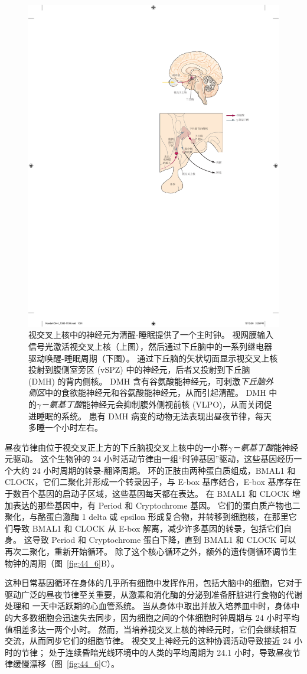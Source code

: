 \begin{figure}[htbp]
	\centering
	\includegraphics[width=0.5\linewidth]{chap44/fig_44_7}
	\caption{视交叉上核中的神经元为清醒-睡眠提供了一个主时钟。
		视网膜输入信号光激活视交叉上核（上图），然后通过下丘脑中的一系列继电器驱动唤醒-睡眠周期（下图）。
		通过下丘脑的矢状切面显示视交叉上核投射到腹侧室旁区 (vSPZ) 中的神经元，后者又投射到下丘脑 (DMH) 的背内侧核。
		DMH 含有谷氨酸能神经元，可刺激\textit{下丘脑外侧区}中的食欲能神经元和谷氨酸能神经元，从而引起清醒。
		DMH 中的\textit{$\gamma$－氨基丁酸}能神经元会抑制腹外侧视前核 (VLPO)，从而关闭促进睡眠的系统。
		患有 DMH 病变的动物无法表现出昼夜节律，每天多睡一个小时左右。}
	\label{fig:44_7}
\end{figure}


昼夜节律由位于视交叉正上方的下丘脑视交叉上核中的一小群\textit{$\gamma$－氨基丁酸}能神经元驱动。
这个生物钟的 24 小时活动节律由一组“时钟基因”驱动，这些基因经历一个大约 24 小时周期的转录-翻译周期。
环的正肢由两种蛋白质组成，BMAL1 和 CLOCK，它们二聚化并形成一个转录因子，与 E-box 基序结合，E-box 基序存在于数百个基因的启动子区域，这些基因每天都在表达。
在 BMAL1 和 CLOCK 增加表达的那些基因中，有 Period 和 Cryptochrome 基因。
它们的蛋白质产物也二聚化，与酪蛋白激酶 1 delta 或 epsilon 形成复合物，并转移到细胞核，在那里它们导致 BMAL1 和 CLOCK 从 E-box 解离，减少许多基因的转录，包括它们自身。
这导致 Period 和 Cryptochrome 蛋白下降，直到 BMAL1 和 CLOCK 可以再次二聚化，重新开始循环。
除了这个核心循环之外，额外的遗传侧循环调节生物钟的周期（图~\ref{fig:44_6}B）。


这种日常基因循环在身体的几乎所有细胞中发挥作用，包括大脑中的细胞，它对于驱动广泛的昼夜节律至关重要，从激素和消化酶的分泌到准备肝脏进行食物的代谢处理和 一天中活跃期的心血管系统。
当从身体中取出并放入培养皿中时，身体中的大多数细胞会迅速失去同步，因为细胞之间的个体细胞时钟周期与 24 小时平均值相差多达一两个小时。
然而，当培养视交叉上核的神经元时，它们会继续相互交流，从而同步它们的细胞节律。
视交叉上神经元的这种协调活动导致接近 24 小时的节律；
处于连续昏暗光线环境中的人类的平均周期为 24.1 小时，导致昼夜节律缓慢漂移（图~\ref{fig:44_6}C）。


